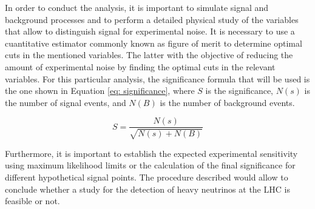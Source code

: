 In order to conduct the analysis, it is important to simulate signal and background processes and to perform a detailed physical study of the variables that allow to distinguish signal for experimental noise. It is necessary to use a cuantitative estimator commonly known as figure of merit to determine optimal cuts in the mentioned variables. The latter with the objective of reducing the amount of experimental noise by finding the optimal cuts in the relevant variables. For this particular analysis, the significance formula that will be used is the one shown in Equation \ref{eq: significance}, where $S$ is the significance, $N(s)$ is the number of signal events, and $N(B)$ is the number of background events.

\begin{equation} \label{eq: significance}
    S = \frac{N(s)}{\sqrt{N(s) + N(B)}}
\end{equation}

Furthermore, it is important to establish the expected experimental sensitivity using maximum likelihood limits or the calculation of the final significance for different hypothetical signal points. The procedure described would allow to conclude whether a study for the detection of heavy neutrinos at the LHC is feasible or not.
